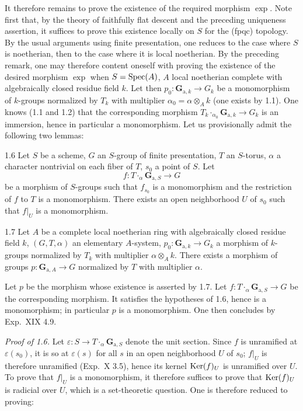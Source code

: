 It therefore remains to prove the existence of the required morphism $\exp$. Note first that, by the theory of faithfully flat descent and the preceding uniqueness assertion, it suffices to prove this existence locally on $S$ for the (fpqc) topology. By the usual arguments using finite presentation, one reduces to the case where $S$ is noetherian, then to the case where it is local noetherian. By the preceding remark, one may therefore content oneself with proving the existence of the desired morphism $\exp$ when $S=\operatorname{Spec}(A)$, $A$ local noetherian complete with algebraically closed residue field $k$. Let then $p_0:\mathbf G_{\mathrm a,k}\to G_k$ be a monomorphism of $k$-groups normalized by $T_k$ with multiplier $\alpha_0=\alpha\otimes_Ak$ (one exists by 1.1). One knows (1.1 and 1.2) that the corresponding morphism $T_k\cdot_{\alpha_0}\mathbf G_{\mathrm a,k}\to G_k$ is an immersion, hence in particular a monomorphism. Let us provisionally admit the following two lemmas:

\begin{lemma}{1.6}\label{XX.1.6}
Let $S$ be a scheme, $G$ an $S$-group of finite presentation, $T$ an $S$-torus, $\alpha$ a character nontrivial on each fiber of $T$, $s_0$ a point of $S$. Let
\[
f:T\cdot_\alpha\mathbf G_{\mathrm a,S}\to G
\]
be a morphism of $S$-groups such that $f_{s_0}$ is a monomorphism and the restriction of $f$ to $T$ is a monomorphism. There exists an open neighborhood $U$ of $s_0$ such that $f|_U$ is a monomorphism.
\end{lemma}

\begin{lemma}{1.7}\label{XX.1.7}
Let $A$ be a complete local noetherian ring with algebraically closed residue field $k$, $(G,T,\alpha)$ an elementary $A$-system, $p_0:\mathbf G_{\mathrm a,k}\to G_k$ a morphism of $k$-groups normalized by $T_k$ with multiplier $\alpha\otimes_Ak$. There exists a morphism of groups $p:\mathbf G_{\mathrm a,A}\to G$ normalized by $T$ with multiplier $\alpha$.
\end{lemma}
Let $p$ be the morphism whose existence is asserted by 1.7. Let $f:T\cdot_\alpha\mathbf G_{\mathrm a,S}\to G$ be the corresponding morphism. It satisfies the hypotheses of 1.6, hence is a monomorphism; in particular $p$ is a monomorphism. One then concludes by Exp.~XIX 4.9.

\emph{Proof of 1.6.} Let $\varepsilon:S\to T\cdot_\alpha\mathbf G_{\mathrm a,S}$ denote the unit section. Since $f$ is unramified at $\varepsilon(s_0)$, it is so at $\varepsilon(s)$ for all $s$ in an open neighborhood $U$ of $s_0$; $f|_U$ is therefore unramified (Exp.~X 3.5),{\renewcommand{\thefootnote}{(3)}} hence its kernel $\operatorname{Ker}(f)_U$ is unramified over $U$. To prove that $f|_U$ is a monomorphism, it therefore suffices{\renewcommand{\thefootnote}{(4)}} to prove that $\operatorname{Ker}(f)_U$ is radicial over $U$, which is a set-theoretic question. One is therefore reduced to proving:

